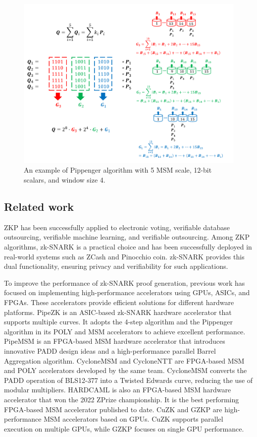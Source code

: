 \documentclass[conference]{IEEEtran}
\begin{document}
\begin{figure}[h]
\label{fig:pippenger}
\centering
\includegraphics[width=1\linewidth]{image/example-pippenger.png}
\caption{An example of Pippenger algorithm with 5 MSM scale, 12-bit scalars, and window size 4.}
\end{figure}

\subsection{Related work}
\todo{}
ZKP has been successfully applied to electronic voting, verifiable database outsourcing, verifiable machine learning, and verifiable outsourcing. Among ZKP algorithms, zk-SNARK is a practical choice and has been successfully deployed in real-world systems such as ZCash and Pinocchio coin. zk-SNARK provides this dual functionality, ensuring privacy and verifiability for such applications. 

To improve the performance of zk-SNARK proof generation, previous work has focused on implementing high-performance accelerators using GPUs, ASICs, and FPGAs. These accelerators provide efficient solutions for different hardware platforms. PipeZK is an ASIC-based zk-SNARK hardware accelerator that supports multiple curves. It adopts the 4-step algorithm and the Pippenger algorithm in its POLY and MSM accelerators to achieve excellent performance. PipeMSM is an FPGA-based MSM hardware accelerator that introduces innovative PADD design ideas and a high-performance parallel Barrel Aggregation algorithm. CycloneMSM and CycloneNTT are FPGA-based MSM and POLY accelerators developed by the same team. CycloneMSM converts the PADD operation of BLS12-377 into a Twisted Edwards curve, reducing the use of modular multipliers. HARDCAML is also an FPGA-based MSM hardware accelerator that won the 2022 ZPrize championship. It is the best performing FPGA-based MSM accelerator published to date. CuZK and GZKP are high-performance MSM accelerators based on GPUs. CuZK supports parallel execution on multiple GPUs, while GZKP focuses on single GPU performance.
\end{document}
